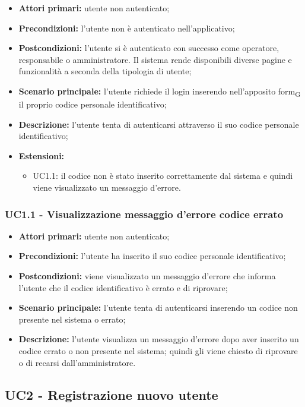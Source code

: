 \begin{itemize}
	\item 	\textbf{Attori primari:} utente non autenticato;
	\item 	\textbf{Precondizioni:} l'utente non è autenticato nell'applicativo;
	\item 	\textbf{Postcondizioni:}	l'utente si è autenticato con successo come operatore, responsabile o amministratore. Il sistema rende disponibili diverse pagine e funzionalità a seconda della tipologia di utente;
	\item 	\textbf{Scenario principale:} l'utente richiede il login inserendo nell'apposito form\textsubscript{G} il proprio codice personale identificativo;
	\item 	\textbf{Descrizione:} l'utente tenta di autenticarsi attraverso il suo codice personale identificativo;
	\item 	\textbf{Estensioni:} 
		\begin{itemize}
			\item UC1.1: il codice non è stato inserito correttamente dal sistema e quindi viene visualizzato un messaggio d'errore.
		\end{itemize}
\end{itemize}
\subsubsection{UC1.1 - Visualizzazione messaggio d'errore codice errato}

\begin{itemize}
	\item 	\textbf{Attori primari:} utente non autenticato;
	\item 	\textbf{Precondizioni:} l'utente ha inserito il suo codice personale identificativo;
	\item 	\textbf{Postcondizioni:} viene visualizzato un messaggio d'errore che informa l'utente che il codice identificativo è errato e di riprovare;
	\item 	\textbf{Scenario principale:} l'utente tenta di autenticarsi inserendo un codice non presente nel sistema o errato;
	\item 	\textbf{Descrizione:} l'utente visualizza un messaggio d'errore dopo aver inserito un codice errato o non presente nel sistema; quindi gli viene chiesto di riprovare o di recarsi dall'amministratore.
	
\end{itemize}

\subsection{UC2 - Registrazione nuovo utente}

